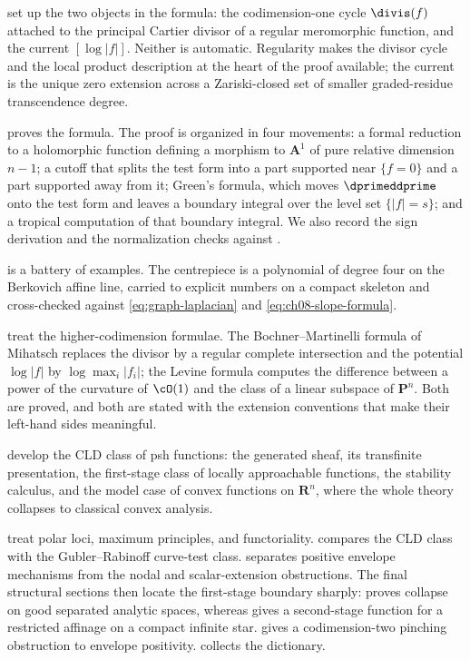 set up the two objects in
the formula: the codimension-one cycle $\divis(f)$ attached to the principal
Cartier divisor of a regular meromorphic function, and the current
$[\log|f|]$.  Neither is automatic.  Regularity makes the divisor cycle and
the local product description at the heart of the proof available; the
current is the unique zero extension across a Zariski-closed set of smaller
graded-residue transcendence degree.

 proves the formula.  The proof is organized in four
movements: a formal reduction to a holomorphic function defining a morphism
to $\mathbf A^1$ of pure relative dimension $n-1$; a cutoff that splits the
test form into a part supported near $\{f=0\}$ and a part supported away from
it; Green's formula, which moves $\dprimeddprime$ onto the test form and
leaves a boundary integral over the level set $\{|f|=s\}$; and a tropical
computation of that boundary integral.  We also record the sign derivation
and the normalization checks against .

 is a battery of examples.  The centrepiece is a
polynomial of degree four on the Berkovich affine line, carried to explicit
numbers on a compact skeleton and cross-checked against
\eqref{eq:graph-laplacian} and \eqref{eq:ch08-slope-formula}.

 treat the higher-codimension formulae.
The Bochner--Martinelli formula of Mihatsch replaces the divisor by a regular
complete intersection and the potential $\log|f|$ by $\log\max_i|f_i|$; the
Levine formula computes the difference between a power of the curvature of
$\cO(1)$ and the class of a linear subspace of $\mathbf P^n$.  Both are
proved, and both are stated with the extension conventions that make their
left-hand sides meaningful.

 develop the CLD
class of psh functions: the generated sheaf, its transfinite presentation,
the first-stage class of locally approachable functions, the stability
calculus, and the model case of convex functions on $\mathbf R^n$, where the
whole theory collapses to classical convex analysis.

 treat polar loci,
maximum principles, and functoriality.   compares
the CLD class with the Gubler--Rabinoff curve-test class.
 separates positive envelope mechanisms from the
nodal and scalar-extension obstructions. The final structural sections
then locate the first-stage boundary sharply: 
proves collapse on good separated analytic spaces, whereas
 gives a second-stage function for a restricted
affinage on a compact infinite star.  gives a
codimension-two pinching obstruction to envelope positivity.
 collects the
dictionary.


